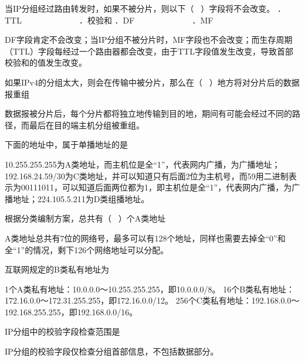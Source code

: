 \question 当IP分组经过路由转发时，如果不被分片，则以下（ ~）字段将不会改变。
．TTL ~ ~ ~ ~ ~ ~ ~ ~ ．校验和 ．DF ~ ~ ~ ~ ~ ~ ~ ~ ．MF
\par{}
\begin{solution}DF字段肯定不会改变；当IP分组不被分片时，MF字段也不会改变；而生存周期（TTL）字段每经过一个路由器都会改变，由于TTL字段值发生改变，导致首部校验和的值发生改变。
\end{solution}
\question 如果IPv4的分组太大，则会在传输中被分片，那么在（
~）地方将对分片后的数据报重组
\par{}
\begin{solution}数据报被分片后，每个分片都将独立地传输到目的地，期间有可能会经过不同的路径，而最后在目的端主机分组被重组。
\end{solution}
\question 下面的地址中，属于单播地址的是
\par{}
\begin{solution}10.255.255.255为A类地址，而主机位是全``1''，代表网内广播，为广播地址；192.168.24.59/30为C类地址，并可以知道只有后面2位为主机号，而59用二进制表示为00111011，可以知道后面两位都为1，即主机位是全``1''，代表网内广播，为广播地址；224.105.5.211为D类组播地址。
\end{solution}
\question 根据分类编制方案，总共有（ ~）个A类地址
\par{}
\begin{solution}A类地址总共有7位的网络号，最多可以有128个地址，同样也需要去掉全``0''和全``1''的情况，剩下126个网络地址可以分配。
\end{solution}
\question 互联网规定的B类私有地址为
\par{}
\begin{solution}1个A类私有地址：10.0.0.0～10.255.255.255，即10.0.0.0/8。
16个B类私有地址：172.16.0.0～172.31.255.255，即172.16.0.0/12。
256个C类私有地址：192.168.0.0～192.168.255.255，即192.168.0.0/16。
\end{solution}
\question IP分组中的校验字段检查范围是
\par{}
\begin{solution}IP分组的校验字段仅检查分组首部信息，不包括数据部分。
\end{solution}
